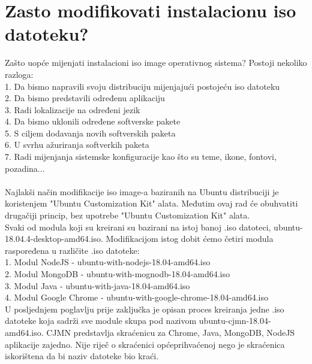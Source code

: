 \documentclass[12pt,vi]{mitthesis}
\begin{document}
\section*{Zasto modifikovati instalacionu iso datoteku?}
Zašto uopće mijenjati instalacioni iso image operativnog sistema? Postoji nekoliko razloga:\\
1. Da bismo napravili svoju distribuciju mijenjajući postojeću iso datoteku\\
2. Da bismo predstavili određenu aplikaciju\\
3. Radi lokalizacije na određeni jezik\\
4. Da bismo uklonili određene softverske pakete\\
5. S ciljem dodavanja novih softverskih paketa\\
6. U svrhu ažuriranja softverkih paketa\\
7. Radi mijenjanja sistemske konfiguracije kao što su teme, ikone, fontovi, pozadina...\\
\\
Najlakši način modifikacije iso image-a baziranih na Ubuntu distribuciji je koristenjem "Ubuntu Customization Kit" alata. Međutim ovaj rad će obuhvatiti drugačiji princip, bez upotrebe "Ubuntu Customization Kit" alata.\\
Svaki od modula koji su kreirani su bazirani na istoj banoj .iso datoteci, ubuntu-18.04.4-desktop-amd64.iso. Modifikacijom istog dobit ćemo četiri modula raspoređena u različite .iso datoteke:\\ 
1. Modul NodeJS - ubuntu-with-nodejs-18.04-amd64.iso\\
2. Modul MongoDB - ubuntu-with-mognodb-18.04-amd64.iso\\
3. Modul Java - ubuntu-with-java-18.04-amd64.iso\\
4. Modul Google Chrome - ubuntu-with-google-chrome-18.04-amd64.iso\\
\indent
U posljednjem poglavlju prije zaključka je opisan proces kreiranja jedne .iso datoteke koja sadrži sve module skupa pod nazivom ubuntu-cjmn-18.04-amd64.iso. CJMN predstavlja skraćenicu za Chrome, Java, MongoDB, NodeJS aplikacije zajedno. Nije riječ o skraćenici općeprihvaćenoj nego je skraćenica iskorištena da bi naziv datoteke bio kraći.
\end{document}
